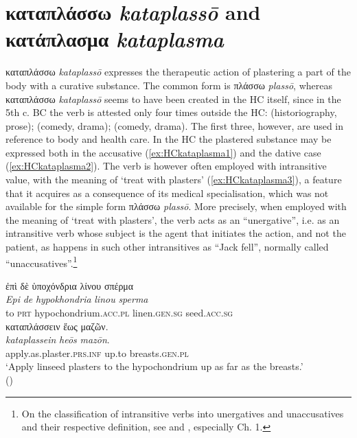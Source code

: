 \documentclass[output=paper,colorlinks,citecolor=brown]{langscibook}
\begin{document}
\section{καταπλάσσω \textit{kataplassō} and κατάπλασμα \textit{kataplasma}}
καταπλάσσω \textit{kataplassō} expresses the therapeutic action of plastering a part of the body with a curative substance. The common form is πλάσσω \textit{plassō}, whereas καταπλάσσω \textit{kataplassō} seems to have been created in the HC itself, since in the 5th c. BC the verb is attested only four times outside the HC:  (historiography, prose);  (comedy, drama);  (comedy, drama). The first three, however, are used in reference to body and health care. 
In the HC the plastered substance may be expressed both in the accusative (\ref{ex:HCkataplasma1}) and the dative case (\ref{ex:HCkataplasma2}). The verb is however often employed with intransitive value, with the meaning of ‘treat with plasters’ (\ref{ex:HCkataplasma3}), a feature that it acquires as a consequence of its medical specialisation, which was not available for the simple form πλάσσω \textit{plassō}. More precisely, when employed with the meaning of ‘treat with plasters’, the verb acts as an “unergative”, i.e. as an intransitive verb whose subject is the agent that initiates the action, and not the patient, as happens in such other intransitives as “Jack fell”, normally called “unaccusatives”.\footnote{On the classification of intransitive verbs into unergatives and unaccusatives and their respective definition, see \citet{Perlmutter1978} and \citet{LevinHovav1995}, especially Ch. 1.} 
\begin{exe}
\ex\label{ex:HCkataplasma1}
\glll ἐπὶ δὲ ὑποχόνδρια λίνου σπέρμα  \\ 
\textit{Epi} \textit{de} \textit{hypokhondria} \textit{linou} \textit{sperma}  \\
to \textsc{prt} hypochondrium.\textsc{acc.pl} linen.\textsc{gen.sg} seed.\textsc{acc.sg}  \\

\glll καταπλάσσειν ἕως μαζῶν. \\
\textit{kataplassein} \textit{heōs} \textit{mazōn}. \\
apply.as.plaster.\textsc{prs.inf} up.to breasts.\textsc{gen.pl} \\
\glt ‘Apply linseed plasters to the hypochondrium up as far as the breasts.’ \\
\hspace*{\fill}()
\end{exe}
\end{document}
